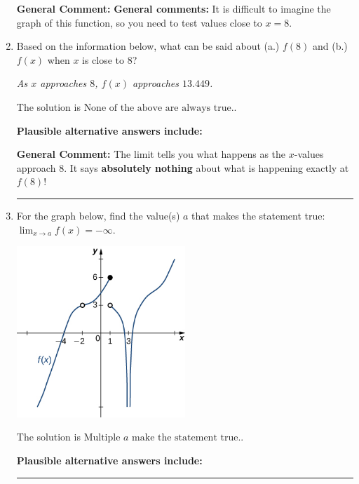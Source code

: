\documentclass{extbook}[14pt]
\newcommand{\litem}[1]{\item #1

\rule{\textwidth}{0.4pt}}
\begin{document}
\begin{enumerate}
{\textbf{General Comment:} \textbf{General comments:} It is difficult to imagine the graph of this function, so you need to test values close to $x = 8$.
}
\litem{
Based on the information below, what can be said about (a.) $f(8)$ and (b.) $f(x)$ when $x$ is close to $8$?

\begin{center}
    \textit{ As $x$ approaches $8$, $f(x)$ approaches $13.449$. }
\end{center}
The solution is \( \text{None of the above are always true.} \).\begin{enumerate}[label=\Alph*.]
\textbf{Plausible alternative answers include:}




\end{enumerate}

\textbf{General Comment:} The limit tells you what happens as the $x$-values approach $8$. It says \textbf{absolutely nothing} about what is happening exactly at $f(8)$!
}
\litem{
For the graph below, find the value(s) $a$ that makes the statement true: $ \displaystyle \lim_{x \rightarrow a} f(x) = -\infty$.

\begin{center}
    \includegraphics[width=0.5\textwidth]{../Figures/evaluateLimitGraphicallyC.png}
\end{center}


The solution is \( \text{Multiple } a \text{ make the statement true}. \).\begin{enumerate}[label=\Alph*.]
\textbf{Plausible alternative answers include:}




\end{enumerate}

}
\end{enumerate}
\end{document}
